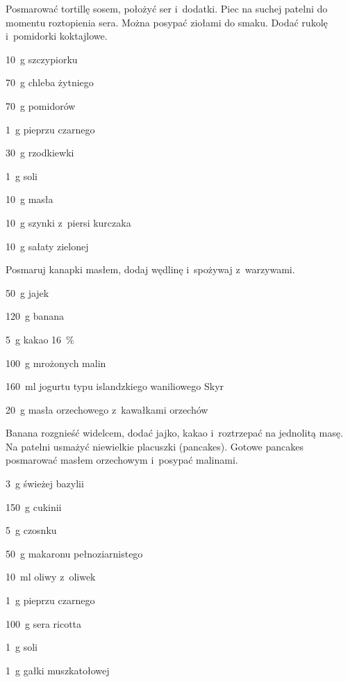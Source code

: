 \documentclass[../main.tex]{subfiles}
\begin{document}
Posmarować tortillę sosem, położyć ser i~dodatki. Piec na suchej patelni do
momentu roztopienia sera. Można posypać ziołami do smaku. Dodać rukolę
i~pomidorki koktajlowe.


\begin{Ingred}
    \item \qty{10}{\gram} szczypiorku
    \item \qty{70}{\gram} chleba żytniego
    \item \qty{70}{\gram} pomidorów
    \item \qty{1}{\gram} pieprzu czarnego
    \item \qty{30}{\gram} rzodkiewki
    \item \qty{1}{\gram} soli
    \item \qty{10}{\gram} masła
    \item \qty{10}{\gram} szynki z~piersi kurczaka
    \item \qty{10}{\gram} sałaty zielonej
\end{Ingred}

Posmaruj kanapki masłem, dodaj wędlinę i~spożywaj z~warzywami.


\begin{Ingred}
    \item \qty{50}{\gram} jajek
    \item \qty{120}{\gram} banana
    \item \qty{5}{\gram} kakao \qty{16}{\percent}
    \item \qty{100}{\gram} mrożonych malin
    \item \qty{160}{\milli\litre} jogurtu typu islandzkiego waniliowego Skyr
    \item \qty{20}{\gram} masła orzechowego z~kawałkami orzechów
\end{Ingred}

Banana rozgnieść widelcem, dodać jajko, kakao i~roztrzepać na jednolitą masę.
Na patelni usmażyć niewielkie placuszki (pancakes). Gotowe pancakes posmarować
masłem orzechowym i~posypać malinami.


\begin{Ingred}
    \item \qty{3}{\gram} świeżej bazylii
    \item \qty{150}{\gram} cukinii
    \item \qty{5}{\gram} czosnku
    \item \qty{50}{\gram} makaronu pełnoziarnistego
    \item \qty{10}{\milli\litre} oliwy z~oliwek
    \item \qty{1}{\gram} pieprzu czarnego
    \item \qty{100}{\gram} sera ricotta
    \item \qty{1}{\gram} soli
    \item \qty{1}{\gram} gałki muszkatołowej
\end{Ingred}
\end{document}
